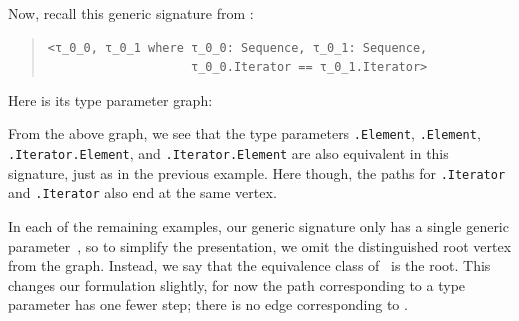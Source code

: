 \documentclass[../generics]{subfiles}
\begin{document}
\begin{example}\label{two sequence same iterator example} Now, recall this generic signature from :
\begin{quote}
\begin{verbatim}
<τ_0_0, τ_0_1 where τ_0_0: Sequence, τ_0_1: Sequence,
                    τ_0_0.Iterator == τ_0_1.Iterator>
\end{verbatim}
\end{quote}
Here is its type parameter graph:
\begin{center}
\end{center}
From the above graph, we see that the type parameters \texttt{\rT.Element}, \texttt{\rU.Element}, \texttt{\rT.Iterator.Element}, and \texttt{\rU.Iterator.Element} are also equivalent in this signature, just as in the previous example. Here though, the paths for \texttt{\rT.Iterator} and \texttt{\rU.Iterator} also end at the same vertex.
\end{example}

In each of the remaining examples, our generic signature only has a single generic parameter~\rT, so to simplify the presentation, we omit the distinguished root vertex from the graph. Instead, we say that the equivalence class of \rT\ is the root. This changes our formulation slightly, for now the path corresponding to a type parameter has one fewer step; there is no edge corresponding to \rT.
\end{document}
